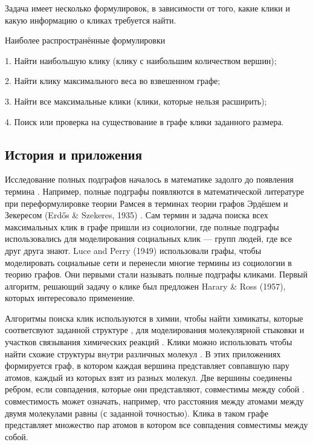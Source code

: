   Задача имеет несколько формулировок, в зависимости от того,
  какие клики и какую информацию о кликах требуется найти.

  Наиболее распространённые формулировки
    
    1.
    Найти наибольшую клику (клику с наибольшим количеством вершин);
    
    2.
    Найти клику максимального веса во взвешенном графе;
    
    3.
    Найти все максимальные клики (клики, которые нельзя расширить);
    
    4.
    Поиск или проверка на существование в графе клики заданного размера.
  
  
  \subsection{История и приложения}
    Исследование полных подграфов началось в математике задолго до появления
    термина \guillemotright.
    Например, полные подграфы появляются в математической литературе при
    переформулировке теории Рамсея в терминах теории графов Эрдёшем и Зекересом 
    (Erdős \& Szekeres, 1935)
    \cite{erdios1935combinatorial}.
    Сам  термин \guillemotright и задача поиска всех максимальных клик в графе пришли из 
    социологии, где полные подграфы использовались для моделирования социальных
    клик --- групп людей, где все друг друга знают.
    Luce and Perry (1949) \cite{luce1949method} использовали графы, чтобы моделировать социальные
    сети и перенесли многие термины из социологии в теорию графов.
    Они первыми стали называть полные подграфы кликами.
    Первый алгоритм, решающий задачу о клике был предложен Harary \& Ross (1957),
    \cite{harary1957procedure}
    которых интересовало \guillemotright применение.

    Алгоритмы поиска клик используются в химии, чтобы найти химикаты, которые
    соответсвуют заданной структуре \cite{rhodes2003clip},
    для моделирования молекулярной стыковки и 
    участков связывания химических реакций \cite{kuhl1984combinatorial}.
    Клики можно использовать чтобы найти схожие структуры внyтри различных молекул \cite{national1995mathematical}.
    В этих приложениях формируется граф, в котором каждая вершина представляет
    совпавшую пару атомов, каждый из которых взят из разных молекул.
    Две вершины соединены ребром, если совпадения, которые они представляют,
    совместимы между собой \cite{muegge2001small}.
    совместимость может означать, например, что расстояния между атомами между
    двумя молекулами равны (с заданной точностью).
    Клика в таком графе представляет множество пар атомов в котором все совпадения
    совместимы между собой.

